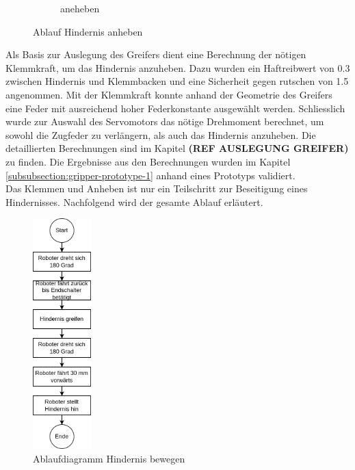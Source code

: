 \begin{figure}[H]
\begin{subfigure}{0.55\textwidth}
\caption{aneheben}
\label{fig:gripper_lifting_side}
\end{subfigure}
\caption{Ablauf Hindernis anheben}
\label{fig:obstacle_gripping_process}
\end{figure}

 \newpage
 
Als Basis zur Auslegung des Greifers dient eine Berechnung der nötigen Klemmkraft, um das Hindernis anzuheben. Dazu wurden ein Haftreibwert von 0.3 zwischen Hindernis und Klemmbacken und eine Sicherheit gegen rutschen von 1.5 angenommen. Mit der Klemmkraft konnte anhand der Geometrie des Greifers eine Feder mit ausreichend hoher Federkonstante ausgewählt werden. Schliesslich wurde zur Auswahl des Servomotors das nötige Drehmoment berechnet, um sowohl die Zugfeder zu verlängern, als auch das Hindernis anzuheben. Die detaillierten Berechnungen sind im Kapitel \textbf{(REF AUSLEGUNG GREIFER)} zu finden. Die Ergebnisse aus den Berechnungen wurden im Kapitel \ref{subsubsection:gripper-prototype-1} anhand eines Prototyps validiert.\\

Das Klemmen und Anheben ist nur ein Teilschritt  zur Beseitigung eines Hindernisses. Nachfolgend wird der gesamte Ablauf erläutert.

\begin{figure}[H]
\centering
\includegraphics[width=0.2\textwidth]{assets/gesamtkonzept/ablaufdiagramm-hindernis-bewegen.png}
\caption{Ablaufdiagramm Hindernis bewegen}
\label{fig:ablaufdiagramm-hindernis-bewegen}
\end{figure}

